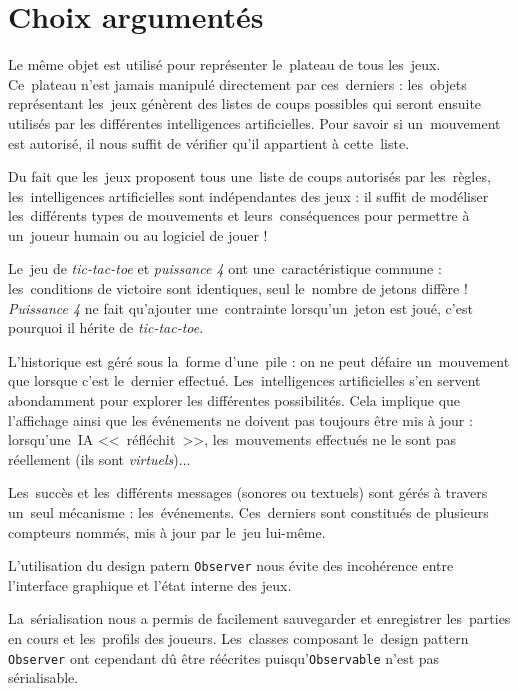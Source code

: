 \section{Choix argumentés}
Le même objet est utilisé pour représenter le~plateau de tous les~jeux. Ce~plateau n'est jamais manipulé directement par ces~derniers :
les~objets représentant les~jeux génèrent des listes de coups possibles qui seront ensuite utilisés par les différentes intelligences artificielles.
Pour savoir si un~mouvement est autorisé, il nous suffit de vérifier qu'il appartient à cette~liste. 

Du fait que les~jeux proposent tous une~liste de coups autorisés par les~règles, les~intelligences artificielles sont indépendantes des jeux :
il suffit de modéliser les~différents types de mouvements et leurs~conséquences pour permettre à un~joueur humain ou au logiciel de jouer !

Le~jeu de \textit{tic-tac-toe} et \textit{puissance 4} ont une~caractéristique commune : les~conditions de victoire sont identiques, seul le~nombre de jetons diffère !
\textit{Puissance 4} ne fait qu'ajouter une~contrainte lorsqu'un~jeton est joué, c'est pourquoi il hérite de \textit{tic-tac-toe}.

L'historique est géré sous la~forme d'une~pile : on ne peut défaire un~mouvement que lorsque c'est le~dernier effectué. 
Les~intelligences artificielles s'en servent abondamment pour explorer les différentes possibilités. 
Cela implique que l'affichage ainsi que les événements ne doivent pas toujours être mis à jour : 
lorsqu'une~IA <<~réfléchit~>>, les~mouvements effectués ne le sont pas réellement (ils sont \emph{virtuels})...

Les~succès et les~différents messages (sonores ou textuels) sont gérés à travers un~seul mécanisme : 
les~événements. Ces~derniers sont constitués de plusieurs compteurs nommés, mis à jour par le~jeu lui-même. 

L'utilisation du design patern \texttt{Observer} nous évite des incohérence entre l'interface graphique et l'état interne des jeux.

La~sérialisation nous a permis de facilement sauvegarder et enregistrer les~parties en cours et les~profils des joueurs. 
Les~classes composant le~design pattern \texttt{Observer} ont cependant dû être réécrites puisqu'\texttt{Observable} n'est pas sérialisable.